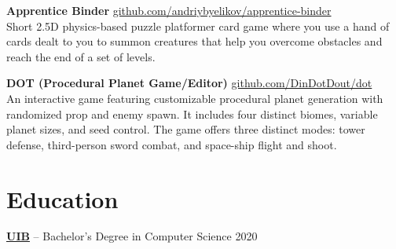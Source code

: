 \documentclass[10pt]{article}       %
\begin{document}

\vspace{5pt}
\textbf{Apprentice Binder} \hfill \href{https://github.com/andriybyelikov/apprentice-binder}{github.com/andriybyelikov/apprentice-binder} \\
Short 2.5D physics-based puzzle platformer card game where you use a hand of cards dealt to you to
summon creatures that help you overcome obstacles and reach the end of a set of levels.

\vspace{5pt}
\textbf{DOT (Procedural Planet Game/Editor)} \hfill \href{https://github.com/DinDotDout/dot}{github.com/DinDotDout/dot} \\
An interactive game featuring customizable procedural planet generation with randomized prop
and enemy spawn. It includes four distinct biomes, variable planet sizes, and seed control.
The game offers three distinct modes: tower defense, third-person sword combat, and space-ship flight and shoot.
\vspace{5pt}
\vspace{-18.5pt}
\section*{Education}
\textbf{\href{https://www.uib.eu/}{UIB}} -- Bachelor's Degree in Computer Science \hfill 2020 \\
\end{document}
